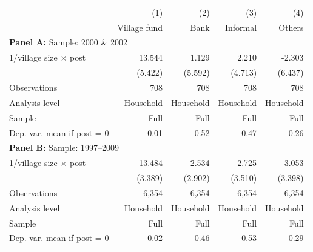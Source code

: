 \begin{center} \begin{threeparttable} \begin{tabular}{l*{4}{r}} \hline \hline 
                    &         (1)&         (2)&         (3)&         (4)\\
                    &Village fund&        Bank&    Informal&      Others\\
\hline \multicolumn{5}{l}{\textbf{Panel A:} Sample: 2000 \& 2002} \\
1/village size $\times$ post&      13.544&       1.129&       2.210&      -2.303\\
                    &     (5.422)&     (5.592)&     (4.713)&     (6.437)\\
Observations        &         708&         708&         708&         708\\
Analysis level      &   Household&   Household&   Household&   Household\\
Sample              &        Full&        Full&        Full&        Full\\
Dep. var. mean if post = 0&        0.01&        0.52&        0.47&        0.26\\
\hline \multicolumn{5}{l}{\textbf{Panel B:} Sample: 1997--2009} \\
1/village size $\times$ post&      13.484&      -2.534&      -2.725&       3.053\\
                    &     (3.389)&     (2.902)&     (3.510)&     (3.398)\\
Observations        &       6,354&       6,354&       6,354&       6,354\\
Analysis level      &   Household&   Household&   Household&   Household\\
Sample              &        Full&        Full&        Full&        Full\\
Dep. var. mean if post = 0&        0.02&        0.46&        0.53&        0.29\\
\hline \end{tabular} \end{threeparttable} \end{center}
